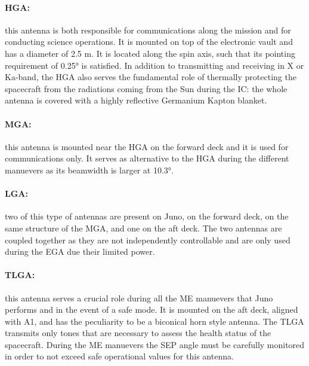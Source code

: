 \vspace{-1mm}

\paragraph{HGA:}this antenna is both responsible for communications along the mission and for conducting science operations.\cite{juno_telecommunication} It is mounted on top of the electronic vault and has a diameter of 2.5 m. It is located along the spin axis, such that its pointing requirement of 0.25° is satisfied.\cite{telecommunication_antennas} In addition to transmitting and receiving in X or Ka-band, the HGA also serves the fundamental role of thermally protecting the spacecraft from the radiations coming from the Sun during the IC: the whole antenna is covered with a highly reflective Germanium Kapton blanket.\cite{ge_kapton}

\vspace{-4mm}

\paragraph{MGA:}this antenna is mounted near the HGA on the forward deck and it is used for communications only. It serves as alternative to the HGA during the different manuevers as its beamwidth is larger at 10.3°.\cite{juno_telecommunication} 

\vspace{-4mm}

\paragraph{LGA:}two of this type of antennas are present on Juno, on the forward deck, on the same structure of the MGA, and one on the aft deck. The two antennas are coupled together as they are not independently controllable and are only used during the EGA due their limited power.\cite{juno_telecommunication} 

\vspace{-4mm}

\paragraph{TLGA:}this antenna serves a crucial role during all the ME manuevers that Juno performs and in the event of a safe mode. It is mounted on the aft deck, aligned with A1, and has the peculiarity to be a biconical horn style antenna. The TLGA transmits only tones that are necessary to assess the health status of the spacecraft. During the ME manuevers the SEP angle must be carefully monitored in order to not exceed safe operational values for this antenna.\cite{juno_telecommunication}


